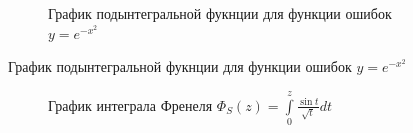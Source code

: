 \documentclass[12pt, a4paper]{article}
\begin{document}
\begin{figure}[H]
\begin{minipage}[t]{.4\textwidth}
\begin{figure}[H]
  \caption{График подынтегральной фукнции для функции ошибок $y =  e^{-x^2}$}
  \label{fig:err_fun}
    \end{figure}
\end{minipage}
\end{figure}

\begin{figure}[H]
\centering
\begin{minipage}[t]{.4\textwidth}
\begin{figure}[H]
  \centering
  \caption{График интеграла Френеля $\Phi_{S}(z) = \int\limits_0^{z} \frac{\sin{t}}{\sqrt{t}} dt$}
  \label{fig:fren1_int}
  \end{figure}%
\end{minipage}\hspace{10pt}%
\begin{minipage}[t]{.4\textwidth}%
\begin{figure}[H]
  \centering

\end{figure}
\end{minipage}
\end{figure}
\end{document}

